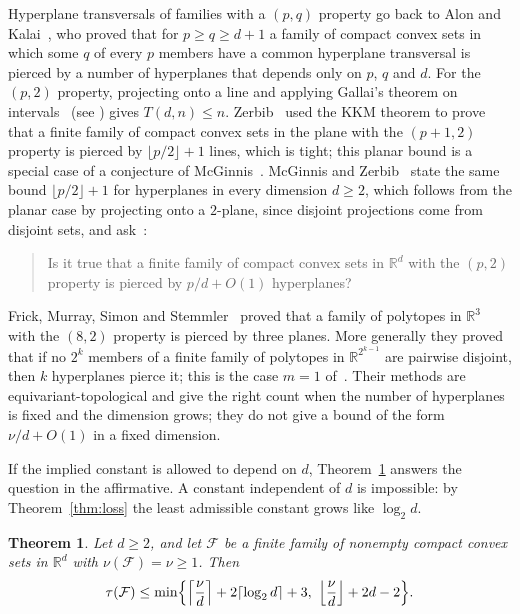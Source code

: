 \documentclass[11pt]{amsart}
\newtheorem{theorem}{Theorem}[section]
\theoremstyle{remark}
\newcommand{\R}{\mathbb R}
\newcommand{\F}{\mathcal F}
\newcommand{\ceil}[1]{\lceil #1\rceil}
\newcommand{\floor}[1]{\lfloor #1\rfloor}
\begin{document}
Hyperplane transversals of families with a $(p,q)$ property go back to Alon and Kalai~\cite{AK95}, who proved that for
$p\ge q\ge d+1$ a family of compact convex sets in which some $q$ of every $p$ members have a common hyperplane
transversal is pierced by a number of hyperplanes that depends only on $p$, $q$ and $d$. For the $(p,2)$ property, projecting onto a line and
applying Gallai's theorem on intervals~\cite{Gal59} (see \cite[Theorem~1.6]{Zer24}) gives $T(d,n)\le n$. Zerbib~\cite[Theorem~1.2]{Zer24} used the KKM theorem
to prove that a finite family of compact convex sets in the plane with the $(p+1,2)$ property is pierced by
$\floor{p/2}+1$ lines, which is tight; this planar bound is a special case of a conjecture of McGinnis~\cite{McG24}. McGinnis and
Zerbib~\cite[Theorem~3.15]{MZ24} state the same bound $\floor{p/2}+1$ for hyperplanes in every dimension $d\ge2$, which
follows from the planar case by projecting onto a $2$-plane, since disjoint projections come from disjoint sets, and
ask~\cite[Question~3.16]{MZ24}:

\begin{quote}
Is it true that a finite family of compact convex sets in $\R^d$ with the $(p,2)$ property is pierced by $p/d+O(1)$
hyperplanes?
\end{quote}

Frick, Murray, Simon and Stemmler~\cite[Theorem~1.7]{FMSS24} proved that a family of polytopes in $\R^3$ with the
$(8,2)$ property is pierced by three planes. More generally they proved
that if no $2^k$ members of a finite family of polytopes in $\R^{2^{k-1}}$ are pairwise disjoint, then $k$ hyperplanes
pierce it; this is the case $m=1$ of~\cite[Theorem~1.5]{FMSS24}. Their methods are equivariant-topological and give the
right count when the number of hyperplanes is fixed and the dimension grows; they do not give a bound of the form
$\nu/d+O(1)$ in a fixed dimension.

If the implied constant is allowed to depend on $d$, Theorem~\ref{thm:upper} answers the question in the affirmative.
A constant independent of $d$ is impossible: by Theorem~\ref{thm:loss} the least admissible constant grows like
$\log_2 d$.

\begin{theorem}\label{thm:upper}
Let $d\ge2$, and let $\F$ be a finite family of nonempty compact convex sets in $\R^d$ with $\nu(\F)=\nu\ge1$. Then
\[
\tau(\F)\le \min\Bigl\{\Bigl\lceil\frac{\nu}{d}\Bigr\rceil+2\ceil{\log_2 d}+3,\ \Bigl\lfloor\frac{\nu}{d}\Bigr\rfloor+2d-2\Bigr\}.
\]
\end{theorem}
\end{document}
